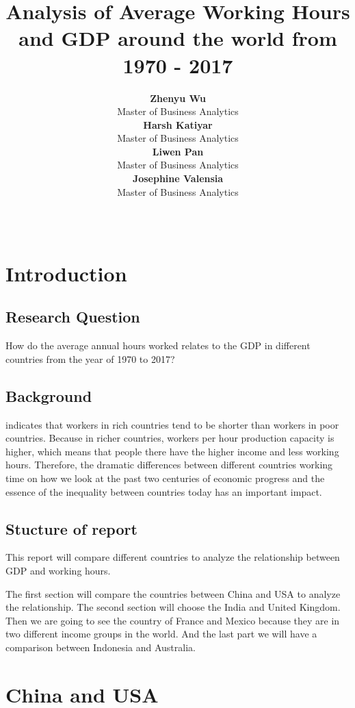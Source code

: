 \documentclass[11pt,a4paper,]{article}
\title{Analysis of Average Working Hours and GDP around the world from 1970 - 2017}
\author{\sf\Large\textbf{ Zhenyu Wu}\\ {\sf\large Master of Business Analytics\\[0.5cm]} \sf\Large\textbf{ Harsh Katiyar}\\ {\sf\large Master of Business Analytics\\[0.5cm]} \sf\Large\textbf{ Liwen Pan}\\ {\sf\large Master of Business Analytics\\[0.5cm]} \sf\Large\textbf{ Josephine Valensia}\\ {\sf\large Master of Business Analytics\\[0.5cm]}}
\date{\sf\Date~\Month~\Year}
\makeatletter
\def\titlepage{\front{\expandafter{\@title}}{\@author}{\@organization}}
\makeatother
\begin{document}
\titlepage

\hypertarget{introduction}{%
\section{Introduction}\label{introduction}}

\hypertarget{research-question}{%
\subsection{Research Question}\label{research-question}}

How do the average annual hours worked relates to the GDP in different countries from the year of 1970 to 2017?

\hypertarget{background}{%
\subsection{Background}\label{background}}

\textcite{reference3} indicates that workers in rich countries tend to be shorter than workers in poor countries. Because in richer countries, workers per hour production capacity is higher, which means that people there have the higher income and less working hours. Therefore, the dramatic differences between different countries working time on how we look at the past two centuries of economic progress and the essence of the inequality between countries today has an important impact.

\hypertarget{stucture-of-report}{%
\subsection{Stucture of report}\label{stucture-of-report}}

This report will compare different countries to analyze the relationship between GDP and working hours.

The first section will compare the countries between China and USA to analyze the relationship. The second section will choose the India and United Kingdom. Then we are going to see the country of France and Mexico because they are in two different income groups in the world. And the last part we will have a comparison between Indonesia and Australia.

\hypertarget{china-and-usa}{%
\section{China and USA}\label{china-and-usa}}
\end{document}
